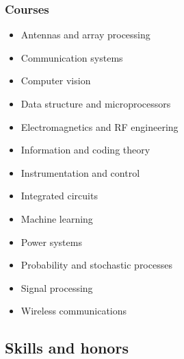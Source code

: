 \documentclass{beamer}
\begin{document}
\begin{frame}
\frametitle{Courses}

\begin{itemize}
  \item \alert{Antennas and array processing}
  \item Communication systems
  \item Computer vision
  \item Data structure and microprocessors
  \item Electromagnetics and RF engineering
  \item \alert{Information and coding theory}
  \item Instrumentation and control
  \item Integrated circuits
  \item Machine learning
  \item Power systems
  \item Probability and stochastic processes
  \item Signal processing
  \item \alert{Wireless communications}
\end{itemize}

\end{frame}


\subsection{Skills and honors}
\end{document}

